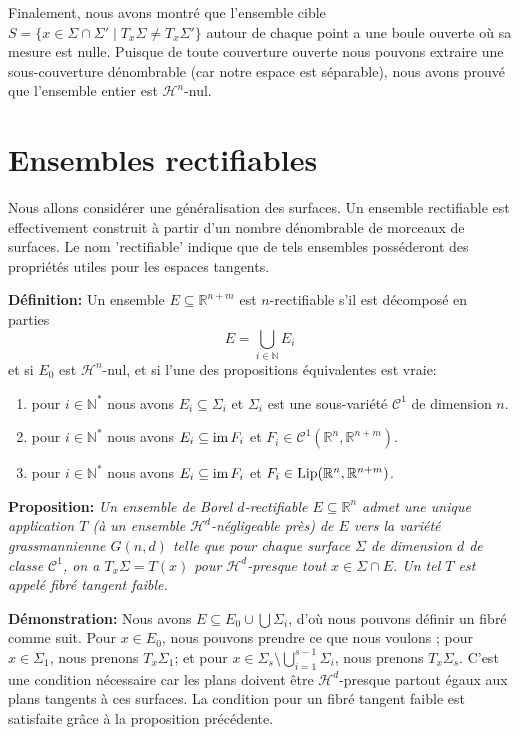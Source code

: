 \documentclass{article}
\begin{document}
\vspace{1ex}
Finalement, nous avons montré que l'ensemble cible $S=\{x\in\Sigma\cap\Sigma'\;|\;T_x\Sigma \neq T_x\Sigma'\}$ autour de chaque point a une boule ouverte où sa mesure est nulle. Puisque de toute couverture ouverte nous pouvons extraire une sous-couverture dénombrable (car notre espace est séparable), nous avons prouvé que l'ensemble entier est $\mathcal H^n$-nul.
\section{Ensembles rectifiables}
Nous allons considérer une généralisation des surfaces. Un ensemble rectifiable
est effectivement construit à partir d'un nombre dénombrable de morceaux de
surfaces. Le nom 'rectifiable' indique que de tels ensembles posséderont des
propriétés utiles pour les espaces tangents.

\vspace{2ex}
\textbf{Définition:}
Un ensemble $E \subseteq \mathbb{R}^{n+m}$ est $n$-rectifiable s'il est décomposé
en parties
\[E=\bigcup_{i\in\mathbb N}E_i\]
et si $E_0$ est $\mathcal{H}^n$-nul, et si l'une des propositions équivalentes est vraie:
\begin{enumerate}
    \item pour $i\in\mathbb N^*$ nous avons $E_i\subseteq \Sigma_i$ et $\Sigma_i$ est une sous-variété $\mathcal C^1$ de dimension $n$.
    \item pour $i\in\mathbb N^*$ nous avons $E_i\subseteq \textnormal{im}\,F_i$ et $F_i\in\mathcal C^1(\mathbb R^n,\mathbb R^{n+m})$.
    \item pour $i\in\mathbb N^*$ nous avons $E_i\subseteq \textnormal{im}\,F_i$ et $F_i\in\textnormal{Lip}(\mathbb R^n,\mathbb R^{n+m})$.
\end{enumerate}

\vspace{2ex}
\textbf{Proposition:} \textit{Un ensemble de Borel $d$-rectifiable $E \subseteq
\mathbb{R}^n$ admet une unique application $T$ (à un ensemble $\mathcal
H^d$-négligeable près) de $E$ vers la variété grassmannienne $G(n, d)$ telle
que pour chaque surface $\Sigma$ de dimension $d$ de classe $\mathcal{C}^1$, on
a $T_x\Sigma = T(x)$ pour $\mathcal{H}^d$-presque tout $x \in \Sigma \cap E$.
Un tel $T$ est appelé fibré tangent faible.}

\vspace{1ex}
\textbf{Démonstration:} Nous avons $E \subseteq E_0 \cup \bigcup \Sigma_i$,
d'où nous pouvons définir un fibré comme suit. Pour $x \in E_0$, nous pouvons
prendre ce que nous voulons ; pour $x \in \Sigma_1$, nous prenons $T_x\Sigma_1$;
et pour $x \in \Sigma_s \setminus \bigcup_{i=1}^{s-1} \Sigma_i$, nous prenons
$T_x\Sigma_s$. C'est une condition nécessaire car les plans doivent être
$\mathcal{H}^d$-presque partout égaux aux plans tangents à ces surfaces. La
condition pour un fibré tangent faible est satisfaite grâce à la proposition
précédente.
\end{document}
